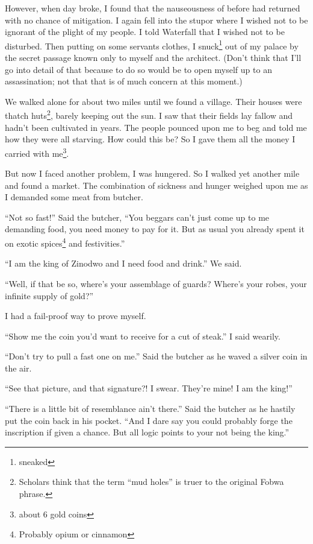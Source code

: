 \tbreak

However, when day broke, I found that the nauseousness of before had returned with no chance of mitigation. I again fell into the stupor where I wished not to be ignorant of the plight of my people. I told Waterfall that I wished not to be disturbed. Then putting on some servants clothes, I snuck\footnote{sneaked} out of my palace by the secret passage known only to myself and the architect. (Don't think that I'll go into detail of that because to do so would be to open myself up to an assassination; not that that is of much concern at this moment.)

We walked alone for about two miles until we found a village.
Their houses were thatch huts\footnote{Scholars think that the term ``mud holes'' is truer to the original Fo\-bwa phrase.}, barely keeping out the sun.
I saw that their fields lay fallow and hadn't been cultivated in years.
The people pounced upon me to beg and told me how they were all starving.
How could this be? So I gave them all the money I carried with me\footnote{about 6 gold coins}.

But now I faced another problem, I was hungered. So I walked yet another mile and found a market.
The combination of sickness and hunger weighed upon me as I demanded some meat from butcher.

``Not so fast!'' Said the butcher, ``You beggars can't just come up to me demanding food, you need money to pay for it.
But as usual you already spent it on exotic spices\footnote{Probably opium or cinnamon} and festivities.''

``I am the king of Zinodwo and I need food and drink.'' We said.

``Well, if that be so, where's your assemblage of guards? Where's your robes, your infinite supply of gold?''

I had a fail-proof way to prove myself.

``Show me the coin you'd want to receive for a cut of steak.'' I said wearily.

``Don't try to pull a fast one on me.'' Said the butcher as he waved a silver coin in the air.

``See that picture, and that signature?! I swear. They're mine! I am the king!''

``There is a little bit of resemblance ain't there.'' Said the butcher as he hastily put the coin back in his pocket.
``And I dare say you could probably forge the inscription if given a chance. But all logic points to your not being the king.''

